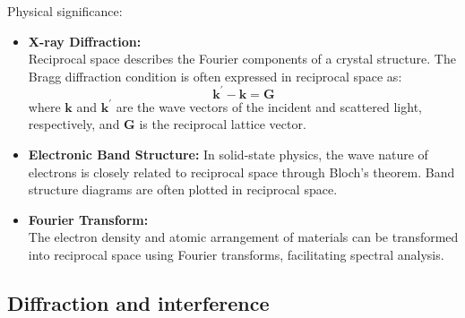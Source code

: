 \documentclass[12pt,a4paper]{article}
\begin{document}
\begin{CJK}{UTF8}{bkai}
Physical significance:
\begin{itemize}
    \item \textbf{X-ray Diffraction:}\\
    Reciprocal space describes the Fourier components of a crystal structure. The Bragg diffraction condition is often expressed in reciprocal space as:
    \begin{equation}
        \mathbf{k^\prime}-\mathbf{k} =\mathbf{G}
    \end{equation}
    where $\mathbf{k}$ and $\mathbf{k^\prime}$ are the wave vectors of the incident and scattered light, respectively, and $\mathbf{G}$ is the reciprocal lattice vector.
    \item \textbf{Electronic Band Structure:}
    In solid-state physics, the wave nature of electrons is closely related to reciprocal space through Bloch's theorem. Band structure diagrams are often plotted in reciprocal space.
    \item \textbf{Fourier Transform:}\\
    The electron density and atomic arrangement of materials can be transformed into reciprocal space using Fourier transforms, facilitating spectral analysis.
\end{itemize}

\subsection{Diffraction and interference}
\hfill


\end{CJK}
\end{document}
